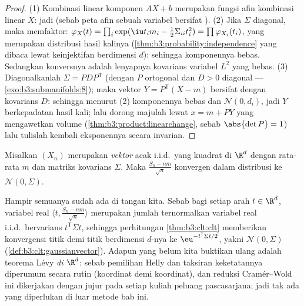 \begin{proof}
(1) Kombinasi linear komponen $AX + b$ merupakan fungsi afin
kombinasi linear $X$: jadi  (sebab peta afin
sebuah variabel  bersifat ).
(2) Jika $\Sigma$ diagonal, maka 
memfaktor: $\varphi_X(t) = \prod_i\exp(\iu t_im_i -
\frac12\Sigma_{ii}t_i^2) = \prod\varphi_{X_i}(t_i)$, yang merupakan
 distribusi hasil kalinya
(\cref{thm:b3:probability:independence} yang dibaca lewat
keinjektifan berdimensi $d$): sehingga komponennya bebas.
Sedangkan konversnya adalah lenyapnya kovarians variabel $L^2$
yang bebas.
(3) Diagonalkanlah $\Sigma = P D P^{\mathsf T}$ (dengan $P$ ortogonal dan
$D > 0$ diagonal --- \cref{exo:b3:submanifolds:8}); maka
vektor $Y = P^{\mathsf T}(X - m)$ bersifat  dengan
kovarians $D$: sehingga menurut (2) komponennya bebas dan
$\mathcal N(0, d_i)$, jadi $Y$ berkepadatan hasil kali; lalu dorong
majulah lewat $x = m + PY$ yang mengawetkan volume
(\cref{thm:b3:product:linearchange}, sebab $\abs{\det P} = 1$) lalu
tulislah kembali eksponennya secara invarian.
\end{proof}

\begin{theorem}
\label{thm:b3:clt:multiclt}
Misalkan $(X_n)$ merupakan \emph{vektor} acak i.i.d.\ yang
 kuadrat di $\R^d$ dengan rata-rata $m$ dan matriks kovarians
$\Sigma$. Maka $\frac{S_n - nm}{\sqrt n}$ konvergen dalam
distribusi ke  $\mathcal N(0,
\Sigma)$.
\admitted
\end{theorem}

\begin{remark}\label{rem:b3:clt:multiclt}
Hampir semuanya sudah ada di tangan kita. Sebab bagi setiap
arah $t \in \R^d$, variabel real $\langle t,
\frac{S_n - nm}{\sqrt n}\rangle$ merupakan jumlah ternormalkan
variabel real i.i.d.\ bervarians $t^{\mathsf T}\Sigma t$,
sehingga perhitungan \cref{thm:b3:clt:clt} memberikan konvergensi
titik demi titik  berdimensi $d$-nya
ke $\eu^{-t^{\mathsf T}\Sigma t/2}$, yakni  $\mathcal N(0, \Sigma)$
(\cref{def:b3:clt:gaussianvector}). Adapun yang belum kita
buktikan ulang adalah teorema  Lévy \emph{di $\R^d$}:
sebab pemilihan Helly dan taksiran keketatannya diperumum
secara rutin (koordinat demi koordinat), dan reduksi Cramér--Wold
ini dikerjakan dengan jujur pada setiap kuliah peluang
pascasarjana; jadi tak ada yang diperlukan di luar metode bab ini.
\end{remark}

